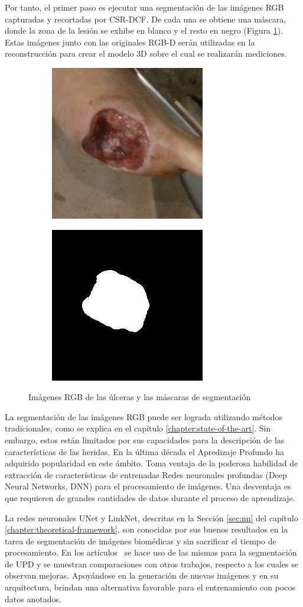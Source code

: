 {Por tanto, el primer paso es ejecutar una segmentación de las imágenes RGB capturadas y recortadas por CSR-DCF. De cada una se obtiene una máscara, donde la zona de la lesión se exhibe en blanco y el resto en negro (Figura \ref{fig:dfuseg}). Estas imágenes junto con las originales RGB-D serán utilizadas en la reconstrucción para crear el modelo 3D sobre el cual se realizarán mediciones.

\begin{figure}[ht]
	\centering
	\begin{subfigure}
		\centering
		\includegraphics[width=.3\linewidth]{./Graphics/dfu.jpg}
	\end{subfigure}
	\begin{subfigure}
		\centering
		\includegraphics[width=.3\linewidth]{./Graphics/mask.jpg}
	\end{subfigure}
	\caption{Imágenes RGB de las úlceras y las máscaras de segmentación}
	\label{fig:dfuseg}
\end{figure}

La segmentación de las imágenes RGB puede ser lograda utilizando métodos tradicionales, como se explica en el capítulo \ref{chapter:state-of-the-art}. Sin embargo, estos están limitados por sus capacidades para la descripción de las características de las heridas. En la última década el Apredizaje Profundo ha adquirido popularidad en este ámbito. Toma ventaja de la poderosa habilidad de extracción de características de entrenadas Redes neuronales profundas (Deep Neural Networks, DNN) para el procesamiento de imágenes. Una desventaja es que requieren de grandes cantidades de datos durante el proceso de aprendizaje.

La redes neuronales UNet y LinkNet, descritas en la Sección \ref{sec:nn} del capítulo \ref{chapter:theoretical-framework}, son conocidas por sus buenos resultados en la tarea de segmentación de imágenes biomédicas y sin sacrificar el tiempo de procesamiento. En los artículos~\cite{chino2020segmenting, cui2019diabetic} se hace uso de las mismas para la segmentación de UPD y se muestran comparaciones con otros trabajos, respecto a los cuales se observan mejoras. Apoyándose en la generación de nuevas imágenes y en su arquitectura, brindan una alternativa favorable para el entrenamiento con pocos datos anotados. 

}
